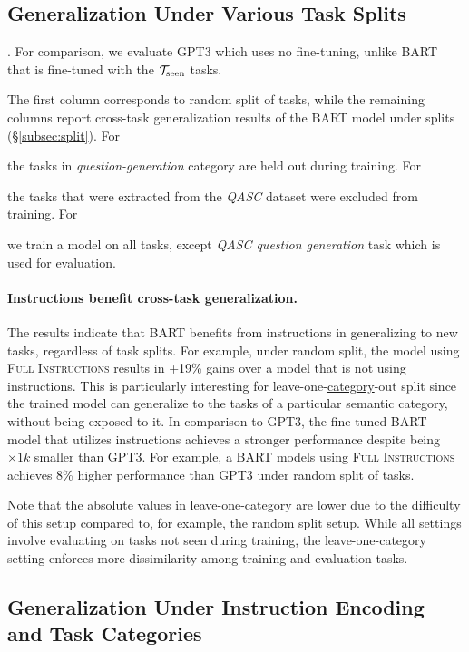\subsection{Generalization Under Various Task Splits}
\label{sec:gen:various:splits}
. For comparison, we evaluate GPT3 which uses no fine-tuning, unlike BART that is fine-tuned with the $\mathcal{T}_{\textnormal{seen}}$ tasks.

The first column corresponds to random split of tasks, while the remaining columns report cross-task generalization results of the BART model under splits (\S\ref{subsec:split}). 
For 

the tasks in \emph{question-generation} category are held out during training. For 

the tasks that were extracted from the \emph{QASC} dataset were excluded from training. For 

we train a model on all tasks, except \emph{QASC question generation} task which is used for evaluation. 

\paragraph{Instructions benefit cross-task generalization.} The results indicate that BART benefits from instructions in generalizing to new tasks, regardless of task splits. For example, under random split, the model using \textsc{Full Instructions}  results in +19\% gains over a model that is not using instructions. This is particularly interesting for 
leave-one-\ul{category}-out split since the trained model can generalize to the tasks of a particular semantic category, without being exposed to it. In comparison to GPT3, the fine-tuned BART model that utilizes instructions  achieves a stronger performance despite being $\times 1k$ smaller than GPT3. For example, a BART models using \textsc{Full Instructions} achieves 8\% higher performance than GPT3 under random split of tasks.  

Note that the absolute values in leave-one-category are lower due to the difficulty of this setup compared to, for example, the random split setup. While all settings involve evaluating on tasks not seen during training, the leave-one-category setting enforces more dissimilarity among training and evaluation tasks.

\subsection{Generalization Under  Instruction Encoding and Task Categories}

